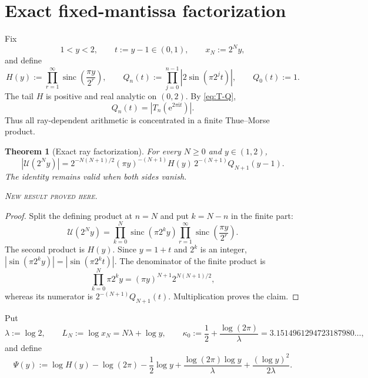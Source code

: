 \documentclass[11pt,oneside]{article}
\newtheorem{theorem}{Theorem}[section]
\theoremstyle{definition}
\theoremstyle{remark}
\newcommand{\sinc}{\operatorname{sinc}}
\newcommand{\e}{\mathrm e}
\newcommand{\ii}{\mathrm i}
\newcommand{\newresult}{\textcolor{newgreen}{\textsc{New result proved here.}}}
\begin{document}
\section{Exact fixed-mantissa factorization}\label{sec:factorization}

Fix
\[
 1<y<2,\qquad t:=y-1\in(0,1),\qquad x_N:=2^Ny,
\]
and define
\begin{equation}
 H(y):=\prod_{r=1}^{\infty}\sinc\!\left(\frac{\pi y}{2^r}\right),
 \qquad
 Q_n(t):=\prod_{j=0}^{n-1}|2\sin(\pi2^jt)|,
 \qquad Q_0(t):=1.
 \label{eq:H-Q-def}
\end{equation}
The tail $H$ is positive and real analytic on $(0,2)$. By \eqref{eq:T-Q},
\begin{equation}
 Q_n(t)=|T_n(\e^{2\pi\ii t})|.
 \label{eq:Q-as-T}
\end{equation}
Thus all ray-dependent arithmetic is concentrated in a finite Thue--Morse product.

\begin{theorem}[Exact ray factorization]\label{thm:exact-factorization}
For every $N\ge0$ and $y\in(1,2)$,
\begin{equation}
 \boxed{
 |\mathscr U(2^Ny)|
 =2^{-N(N+1)/2}(\pi y)^{-(N+1)}H(y)\,2^{-(N+1)}Q_{N+1}(y-1).}
 \label{eq:exact-factorization}
\end{equation}
The identity remains valid when both sides vanish.

\smallskip\noindent\newresult
\end{theorem}

\begin{proof}
Split the defining product at $n=N$ and put $k=N-n$ in the finite part:
\[
 \mathscr U(2^Ny)=\prod_{k=0}^{N}\sinc(\pi2^ky)
 \prod_{r=1}^{\infty}\sinc\!\left(\frac{\pi y}{2^r}\right).
\]
The second product is $H(y)$. Since $y=1+t$ and $2^k$ is an integer,
$|\sin(\pi2^ky)|=|\sin(\pi2^kt)|$. The denominator of the finite product is
\[
 \prod_{k=0}^{N}\pi2^ky=(\pi y)^{N+1}2^{N(N+1)/2},
\]
whereas its numerator is $2^{-(N+1)}Q_{N+1}(t)$. Multiplication proves the claim.
\end{proof}

Put
\begin{equation}
 \lambda:=\log2,
 \qquad L_N:=\log x_N=N\lambda+\log y,
 \qquad
 \kappa_0:=\frac12+\frac{\log(2\pi)}{\lambda}
 =3.1514961294723187980\ldots,
 \label{eq:lambda-kappa0}
\end{equation}
and define
\begin{equation}
 \Psi(y):=\log H(y)-\log(2\pi)-\frac12\log y
 +\frac{\log(2\pi)\log y}{\lambda}
 +\frac{(\log y)^2}{2\lambda}.
 \label{eq:Psi-def}
\end{equation}
\end{document}
